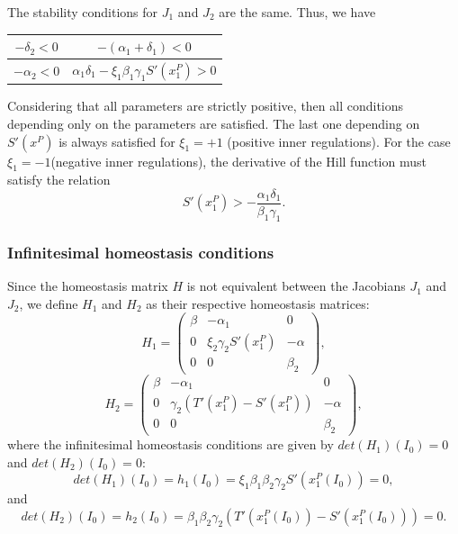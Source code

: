 The stability conditions for $J_1$ and $J_2$ are the same. 
Thus, we have
{
    \setlength{\tabcolsep}{10pt}
    \renewcommand{\arraystretch}{3.0}
\begin{table}[H]
    \centering
    \begin{tabular}{|c|c|}
        \hline
        $-\delta_2 < 0$ & $-(\alpha_1 + \delta_1) < 0$ \\
        \hline
        $-\alpha_2 < 0$ & $\alpha_1 \delta_1 - \xi_1 \beta_1 \gamma_1 S'(x_1^P) > 0$\\
        \hline
    \end{tabular}
\end{table}
}

Considering that all parameters are strictly positive, then all
conditions depending only on the parameters are satisfied. The 
last one depending on $S'(x^P)$ is always satisfied for 
$\xi_1 = +1$ (positive inner regulations). For the case 
$\xi_1 = -1$(negative inner regulations), the derivative of the Hill function must satisfy 
the relation
\begin{equation}
    S'(x_1^P) > -\dfrac{\alpha_1 \delta_1}{\beta_1 \gamma_1}.
\end{equation} 

\subsubsection{Infinitesimal homeostasis conditions}

Since the homeostasis matrix $H$ is not equivalent between the 
Jacobians $J_1$ and $J_2$, we define $H_1$ and $H_2$ as 
their respective homeostasis matrices:
\begin{equation}
    H_1 = 
    \begin{pmatrix}
        \beta & -\alpha_1 & 0\\
        0 & \xi_2 \gamma_2 S'(x_1^P) & -\alpha\\
        0 & 0 & \beta_2
    \end{pmatrix},
\end{equation}
\begin{equation}
    H_2 = 
    \begin{pmatrix}
        \beta & -\alpha_1 & 0\\
        0 & \gamma_2(T'(x_1^P) - S'(x_1^P)) & -\alpha\\
        0 & 0 & \beta_2
    \end{pmatrix},
\end{equation}
where the infinitesimal homeostasis conditions are given by 
$det(H_1)(I_0) = 0$ and $det(H_2)(I_0) = 0$:
\begin{equation}
    det(H_1)(I_0) = h_1(I_0) = \xi_1 \beta_1 \beta_2 
    \gamma_2 S'(x_1^P(I_0)) = 0,
\end{equation}
and 
\begin{equation}
    det(H_2)(I_0) = h_2(I_0) = \beta_1 \beta_2 
    \gamma_2 (T'(x_1^P(I_0)) - S'(x_1^P(I_0))) = 0.
\end{equation}

